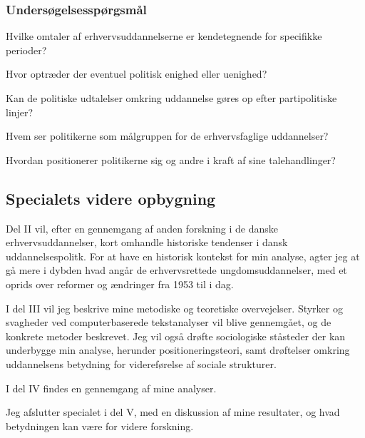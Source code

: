 \subsubsection{Undersøgelsesspørgsmål}\label{sec:resqs}

Hvilke omtaler af erhvervsuddannelserne er kendetegnende for specifikke perioder?

Hvor optræder der eventuel politisk enighed eller uenighed?

Kan de politiske udtalelser omkring uddannelse gøres op efter partipolitiske linjer?

Hvem ser politikerne som målgruppen for de erhvervsfaglige uddannelser?

Hvordan positionerer politikerne sig og andre i kraft af sine talehandlinger?

\subsection{Specialets videre opbygning}\label{sec:structure}

Del II vil, efter en gennemgang af anden forskning i de danske erhvervsuddannelser, kort omhandle historiske tendenser i dansk uddannelsespolitk.
For at have en historisk kontekst for min analyse, agter jeg at gå mere i dybden hvad angår de erhvervsrettede ungdomsuddannelser, med et oprids over reformer og ændringer fra 1953 til i dag.

I del III vil jeg beskrive mine metodiske og teoretiske overvejelser.
Styrker og svagheder ved computerbaserede tekstanalyser vil blive gennemgået, og de konkrete metoder beskrevet.
Jeg vil også drøfte sociologiske ståsteder der kan underbygge min analyse, herunder positioneringsteori, samt drøftelser omkring uddannelsens betydning for videreførelse af sociale strukturer.

I del IV findes en gennemgang af mine analyser.

Jeg afslutter specialet i del V, med en diskussion af mine resultater, og hvad betydningen kan være for videre forskning.
